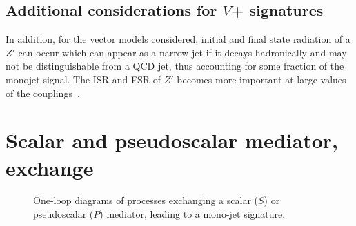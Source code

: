 

\subsection{Additional considerations for $V$+\MET{} signatures}
\label{sec:bosonrad}

In addition, for the vector models considered, initial and final state radiation of a $Z'$ can occur which can appear as a narrow jet if it decays hadronically and may not be distinguishable from a QCD jet, thus accounting for some fraction of the monojet signal. The ISR and FSR of $Z'$ becomes more important at large values of the couplings~\cite{Bai:2015nfa}. 

\section{Scalar and pseudoscalar mediator, \schannel exchange}
\label{sec:monojet_scalar}

\begin{figure}
\centering
{}\linewidth
\vspace{0.5\baselineskip}
	\caption
	{
		One-loop diagrams of processes exchanging a scalar ($S$) or pseudoscalar ($P$) mediator, leading to a mono-jet signature. 
	}
	\label{fig:feyn_prod_S}
\end{figure}

